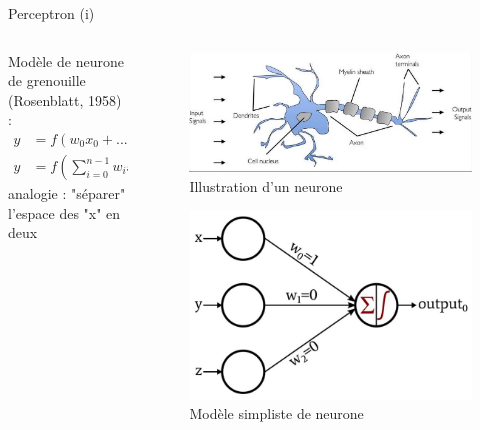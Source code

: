 \documentclass[9pt, aspectratio=169]{beamer}
\begin{document}
\begin{frame}{Perceptron (i)} %

\begin{columns}
    \begin{column}{0.6\textwidth}
Modèle de neurone de grenouille (Rosenblatt, 1958) :
\begin{align*}
	y &= f(w_0 x_0 + ... + w_{n-1} x_{n-1} + b) \\
	y &= f\left( \sum\limits_{i=0}^{n-1}	 w_i x_i + b\right)
\end{align*}
analogie : "séparer" l'espace des "x" en deux

    \end{column}
    \begin{column}{0.38\textwidth}
		\begin{figure}
		\includegraphics[width=\linewidth]{fig/biological_neuron.png}
		\caption{Illustration d'un neurone}
		\end{figure}
		\begin{figure}
		\includegraphics[width=0.55\linewidth]{fig/perceptron.jpg}
		\caption{Modèle simpliste de neurone}
		\end{figure}
    \end{column}
\end{columns}

\end{frame}
\end{document}
